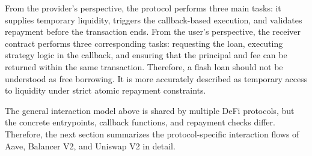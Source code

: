 From the provider's perspective, the protocol performs three main tasks: it supplies temporary liquidity, triggers the callback-based execution, and validates repayment before the transaction ends. From the user's perspective, the receiver contract performs three corresponding tasks: requesting the loan, executing strategy logic in the callback, and ensuring that the principal and fee can be returned within the same transaction. Therefore, a flash loan should not be understood as free borrowing. It is more accurately described as temporary access to liquidity under strict atomic repayment constraints.

The general interaction model above is shared by multiple DeFi protocols, but the concrete entrypoints, callback functions, and repayment checks differ. Therefore, the next section summarizes the protocol-specific interaction flows of Aave, Balancer V2, and Uniswap V2 in detail.
